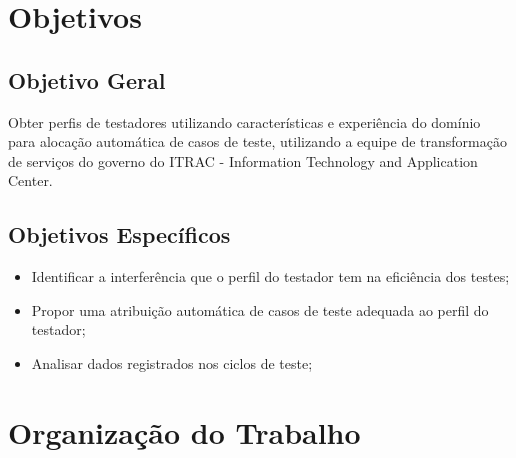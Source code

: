 \section{Objetivos}
\subsection{Objetivo Geral}

Obter perfis de testadores utilizando características e experiência do domínio para alocação automática de casos de teste,
utilizando a equipe de transformação de serviços do governo do ITRAC - Information Technology and Application Center.

\subsection{Objetivos Específicos}

\begin{itemize}
		\item Identificar a interferência que o perfil do testador tem na eficiência dos testes;
		\item Propor uma atribuição automática de casos de teste adequada ao perfil do testador; 
		\item Analisar dados registrados nos ciclos de teste;
	\end{itemize}

\section{Organização do Trabalho}


